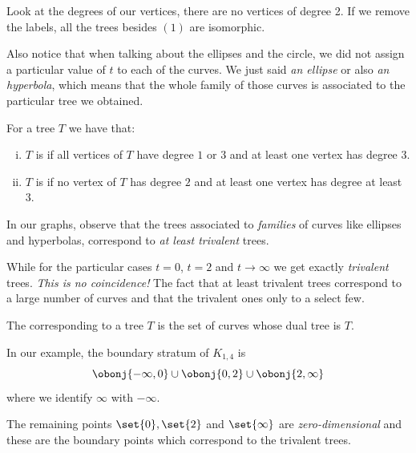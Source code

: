 \documentclass[12pt]{memoir}
\begin{document}
\begin{Rmk}
Look at the degrees of our vertices, there are no vertices of degree 2. If we remove the labels, all the trees besides $(1)$ are isomorphic.\par
Also notice that when talking about the ellipses and the circle, we did not assign a particular value of $t$ to each of the curves. We just said \emph{an ellipse} or also \emph{an hyperbola}, which means that the whole family of those curves is associated to the particular tree we obtained.
\end{Rmk}

\begin{Def}
For a tree $T$ we have that:
\begin{enumerate}[i)]
    \itemsep=-0.4em
    \item $T$ is  if all vertices of $T$ have degree $1$ or $3$ and at least one vertex has degree $3$.
    \item $T$ is  if no vertex of $T$ has degree $2$ and at least one vertex has degree at least $3$.
\end{enumerate}
\end{Def}

\begin{Rmk}
In our graphs, observe that the trees associated to \emph{families} of curves like ellipses and hyperbolas, correspond to \emph{at least trivalent} trees.\par 
While for the particular cases $t=0$, $t=2$ and $t\to\infty$ we get exactly \emph{trivalent} trees. \emph{This is no coincidence!} The fact that at least trivalent trees correspond to a large number of curves and that the trivalent ones only to a select few.
\end{Rmk}

\begin{Def}
    The  corresponding to a tree $T$ is the set of curves whose dual tree is $T$. 
\end{Def}

\begin{Ex}
In our example, the boundary stratum of $K_{1,4}$ is $$\obonj{-\infty,0}\cup\obonj{0,2}\cup\obonj{2,\infty}$$
where we identify $\infty$ with $-\infty$.\par 
The remaining points $\set{0},\set{2}$ and $\set{\infty}$ are \emph{zero-dimensional} and these are the boundary points which correspond to the trivalent trees.
\end{Ex} 
\end{document}

